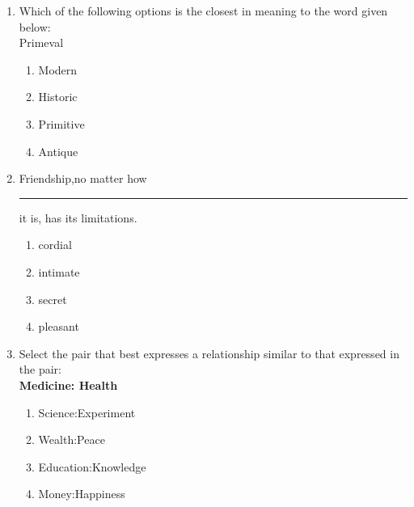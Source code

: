 \documentclass[journal]{IEEEtran}
\begin{document}
\begin{enumerate}
\begin{multicols}{4}
\end{multicols}
\item Which of the following options is the closest in meaning to the word given below:\\
Primeval
\begin{multicols}{2}
\begin{enumerate}
        \item Modern
        \item Historic
        \item Primitive
        \item Antique
    \end{enumerate}
\end{multicols}
\item Friendship,no matter how \rule{1.7cm}{0.2mm} it is, has its limitations.
\begin{enumerate}
    \item cordial
    \item intimate
    \item secret
    \item pleasant
\end{enumerate}
\item Select the pair that best expresses a relationship similar to that expressed in the pair:\\
\textbf{Medicine: Health}
\begin{multicols}{2}
\begin{enumerate}
    \item Science:Experiment
    \item Wealth:Peace
    \item Education:Knowledge
    \item Money:Happiness
\end{enumerate}
\end{multicols}

\end{enumerate}
\end{document}
